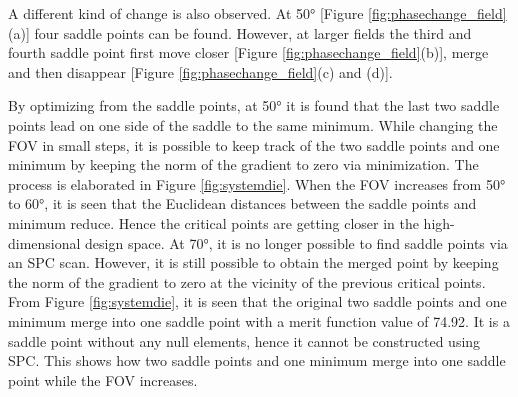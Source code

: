 A different kind of change is also observed. At 50° [Figure \ref{fig:phasechange_field}(a)] four saddle points can be found. However, at larger fields the third and fourth saddle point first move closer [Figure \ref{fig:phasechange_field}(b)], merge and then disappear [Figure \ref{fig:phasechange_field}(c) and (d)]. 

By optimizing from the saddle points, at 50° it is found that the last two saddle points lead on one side of the saddle to the same minimum. While changing the FOV in small steps, it is possible to keep track of the two saddle points and one minimum by keeping the norm of the gradient to zero via minimization. The process is elaborated in Figure \ref{fig:systemdie}. When the FOV increases from 50° to 60°, it is seen that the Euclidean distances between the saddle points and minimum reduce. Hence the critical points are getting closer in the high-dimensional design space. At 70°, it is no longer possible to find saddle points via an SPC scan. However, it is still possible to obtain the merged point by keeping the norm of the gradient to zero at the vicinity of the previous critical points. From Figure \ref{fig:systemdie}, it is seen that the original two saddle points and one minimum merge into one saddle point with a merit function value of 74.92. It is a saddle point without any null elements, hence it cannot be constructed using SPC. This shows how two saddle points and one minimum merge into one saddle point while the FOV increases. 

